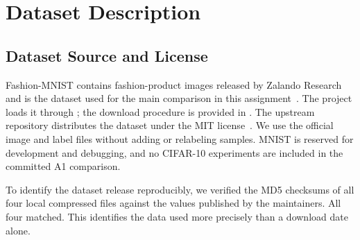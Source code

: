 \section{Dataset Description}
\label{sec:dataset-description}

\subsection{Dataset Source and License}

Fashion-MNIST contains fashion-product images released by Zalando Research and is the dataset used for the main comparison in this assignment~\cite{fashionmnist-repository}. The project loads it through ; the download procedure is provided in . The upstream repository distributes the dataset under the MIT license~\cite{fashionmnist-license}. We use the official image and label files without adding or relabeling samples. MNIST is reserved for development and debugging, and no CIFAR-10 experiments are included in the committed A1 comparison.

To identify the dataset release reproducibly, we verified the MD5 checksums of all four local compressed files against the values published by the maintainers. All four matched. This identifies the data used more precisely than a download date alone.

